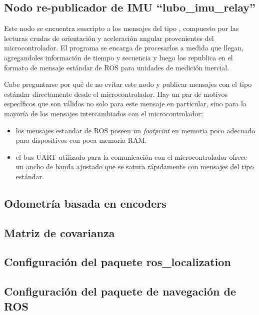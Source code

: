 \subsection{Nodo re-publicador de IMU ``lubo\_imu\_relay''}

Este nodo se encuentra suscripto a los mensajes del tipo , compuesto por las lecturas crudas de orientación y aceleración angular provenientes del microcontrolador. El programa se encarga de procesarlos a medida que llegan, agregandoles información de tiempo y secuencia y luego los republica en el formato de mensaje estándar de ROS para unidades de medición inercial\protect\footnotemark.

Cabe preguntarse por qué de no evitar este nodo y publicar  mensajes con el tipo estándar directamente desde el microcontrolador. Hay un par de motivos específicos que son válidos no solo para este mensaje en particular, sino para la mayoría de los mensajes intercambiados con el microcontrolador:
\begin{itemize}
  \item los mensajes estandar de ROS poseen un \textit{footprint} en memoria poco adecuado para dispositivos con poca memoria RAM.
  \item el bus UART utilizado para la comunicación con el microcontrolador ofrece un ancho de banda ajustado que se satura rápidamente con mensajes del tipo estándar.
\end{itemize}


\subsection{Odometría basada en encoders}

\subsection{Matriz de covarianza}

\subsection{Configuración del paquete ros\_localization}

\subsection{Configuración del paquete de navegación de ROS}